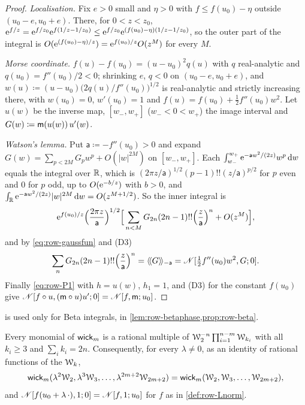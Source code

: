 \begin{proof}
\emph{Localisation.} Fix $e>0$ small and $\eta>0$ with $f\leq f(u_0)-\eta$ outside $(u_0-e,u_0+e)$. There, for $0<z<z_0$, $\mathrm{e}^{f/z}=\mathrm{e}^{f/z_0}\mathrm{e}^{f(1/z-1/z_0)}\leq\mathrm{e}^{f/z_0}\mathrm{e}^{(f(u_0)-\eta)(1/z-1/z_0)}$, so the outer part of the integral is $O(\mathrm{e}^{(f(u_0)-\eta)/z})=\mathrm{e}^{f(u_0)/z}O(z^M)$ for every $M$.

\emph{Morse coordinate.} $f(u)-f(u_0)=(u-u_0)^2q(u)$ with $q$ real-analytic and $q(u_0)=f''(u_0)/2<0$; shrinking $e$, $q<0$ on $(u_0-e,u_0+e)$, and $w(u)\coloneqq(u-u_0)\big(2q(u)/f''(u_0)\big)^{1/2}$ is real-analytic and strictly increasing there, with $w(u_0)=0$, $w'(u_0)=1$ and $f(u)=f(u_0)+\frac12f''(u_0)w^2$. Let $u(w)$ be the inverse map, $[w_-,w_+]$ ($w_-<0<w_+$) the image interval and $G(w)\coloneqq\mathsf{m}(u(w))\,u'(w)$.

\emph{Watson's lemma.} Put $\mathsf{a}\coloneqq-f''(u_0)>0$ and expand $G(w)=\sum_{p<2M}G_pw^p+O(|w|^{2M})$ on $[w_-,w_+]$. Each $\int_{w_-}^{w_+}\mathrm{e}^{-\mathsf{a}w^2/(2z)}w^p\,\mathrm{d} w$ equals the integral over $\mathbb{R}$, which is $(2\pi z/\mathsf{a})^{1/2}(p-1)!!(z/\mathsf{a})^{p/2}$ for $p$ even and $0$ for $p$ odd, up to $O(\mathrm{e}^{-b/z})$ with $b>0$, and $\int_{\mathbb{R}}\mathrm{e}^{-\mathsf{a}w^2/(2z)}|w|^{2M}\,\mathrm{d} w=O(z^{M+1/2})$. So the inner integral is
\[
\mathrm{e}^{f(u_0)/z}\Big(\frac{2\pi z}{\mathsf{a}}\Big)^{1/2}\Big[\sum_{n<M}G_{2n}(2n-1)!!\Big(\frac z{\mathsf{a}}\Big)^n+O(z^M)\Big],
\]
and by \eqref{eq:row-gaussfun} and (D3)
\[
\sum_nG_{2n}(2n-1)!!\Big(\frac z{\mathsf{a}}\Big)^n=\langle\!\langle G\rangle\!\rangle_{-\mathsf{a}}=\mathscr{N}[\tfrac12f''(u_0)w^2,G;0].
\]
Finally \eqref{eq:row-P1} with $h=u(w)$, $h_1=1$, and (D3) for the constant $f(u_0)$ give $\mathscr{N}[f\circ u,(\mathsf{m}\circ u)u';0]=\mathscr{N}[f,\mathsf{m};u_0]$.
\end{proof}

 is used only for Beta integrals, in \cref{lem:row-betaphase,prop:row-beta}.

\begin{lem}
\label{lem:row-homog}
Every monomial of $\mathsf{wick}_m$ is a rational multiple of $\mathcal{W}_2^{-n}\prod_{i=1}^{n-m}\mathcal{W}_{k_i}$ with all $k_i\geq3$ and $\sum_ik_i=2n$. Consequently, for every $\lambda\neq0$, as an identity of rational functions of the $\mathcal{W}_k$,
\begin{equation}
\label{eq:row-homog}
\mathsf{wick}_m(\lambda^2\mathcal{W}_2,\lambda^3\mathcal{W}_3,\dots,\lambda^{2m+2}\mathcal{W}_{2m+2})=\mathsf{wick}_m(\mathcal{W}_2,\mathcal{W}_3,\dots,\mathcal{W}_{2m+2}),
\end{equation}
and $\mathscr{N}[f(u_0+\lambda\,\cdot),1;0]=\mathscr{N}[f,1;u_0]$ for $f$ as in \cref{def:row-Lnorm}.
\end{lem}

